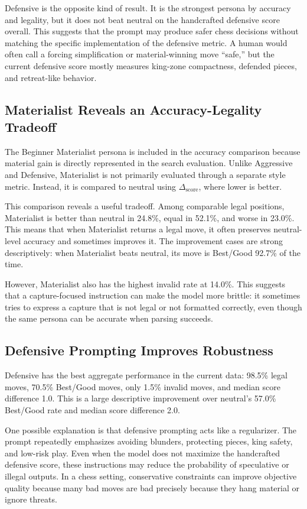 \documentclass[10pt]{article}
\begin{document}
Defensive is the opposite kind of result. It is the strongest persona by accuracy and legality, but it does not beat neutral on the handcrafted defensive score overall. This suggests that the prompt may produce safer chess decisions without matching the specific implementation of the defensive metric. A human would often call a forcing simplification or material-winning move ``safe,'' but the current defensive score mostly measures king-zone compactness, defended pieces, and retreat-like behavior.

\subsection{Materialist Reveals an Accuracy-Legality Tradeoff}

The Beginner Materialist persona is included in the accuracy comparison because material gain is directly represented in the search evaluation. Unlike Aggressive and Defensive, Materialist is not primarily evaluated through a separate style metric. Instead, it is compared to neutral using $\Delta_{\text{score}}$, where lower is better.

This comparison reveals a useful tradeoff. Among comparable legal positions, Materialist is better than neutral in 24.8\%, equal in 52.1\%, and worse in 23.0\%. This means that when Materialist returns a legal move, it often preserves neutral-level accuracy and sometimes improves it. The improvement cases are strong descriptively: when Materialist beats neutral, its move is Best/Good 92.7\% of the time.

However, Materialist also has the highest invalid rate at 14.0\%. This suggests that a capture-focused instruction can make the model more brittle: it sometimes tries to express a capture that is not legal or not formatted correctly, even though the same persona can be accurate when parsing succeeds.

\subsection{Defensive Prompting Improves Robustness}

Defensive has the best aggregate performance in the current data: 98.5\% legal moves, 70.5\% Best/Good moves, only 1.5\% invalid moves, and median score difference 1.0. This is a large descriptive improvement over neutral's 57.0\% Best/Good rate and median score difference 2.0.

One possible explanation is that defensive prompting acts like a regularizer. The prompt repeatedly emphasizes avoiding blunders, protecting pieces, king safety, and low-risk play. Even when the model does not maximize the handcrafted defensive score, these instructions may reduce the probability of speculative or illegal outputs. In a chess setting, conservative constraints can improve objective quality because many bad moves are bad precisely because they hang material or ignore threats.
\end{document}
